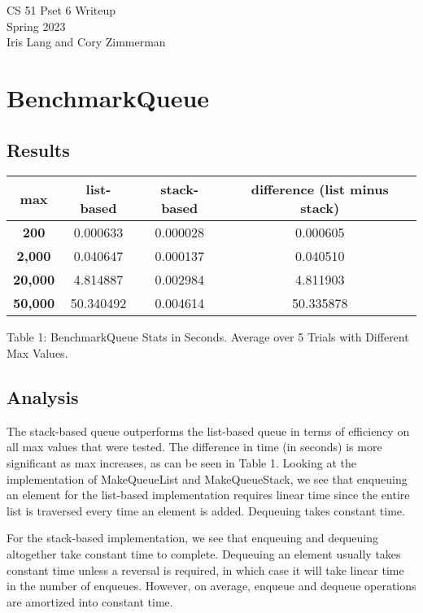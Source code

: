 \documentclass[12pt]{article}
\begin{document}
\begin{center}
{\Large CS 51 Pset 6 Writeup}\\
{\Large Spring 2023}\\
{\Large Iris Lang and Cory Zimmerman}\\
\end{center}


\section{BenchmarkQueue}

\subsection{Results}

\begin{center}
\begin{tabular}{ |c|c|c|c| } 
\hline
\textbf{max} & \textbf{list-based} & \textbf{stack-based} & \textbf{difference (list minus stack)} \\
\hline
\textbf{200} & 0.000633 & 0.000028 & 0.000605 \\ 
\textbf{2,000} & 0.040647 & 0.000137 & 0.040510 \\ 
\textbf{20,000} & 4.814887 & 0.002984 & 4.811903 \\
\textbf{50,000} & 50.340492 & 0.004614 & 50.335878 \\
\hline
\end{tabular}
\end{center}
Table 1: BenchmarkQueue Stats in Seconds. Average over 5 Trials with Different Max Values.


\subsection{Analysis}
\noindent

The stack-based queue outperforms the list-based queue in terms of efficiency on all max values that were tested. The difference in time (in seconds) is more significant as max increases, as can be seen in Table 1. Looking at the implementation of MakeQueueList and MakeQueueStack, we see that enqueuing an element for the list-based implementation requires linear time since the entire list is traversed every time an element is added. Dequeuing takes constant time.

For the stack-based implementation, we see that enqueuing and dequeuing altogether take constant time to complete. Dequeuing an element usually takes constant time unless a reversal is required, in which case it will take linear time in the number of enqueues. However, on average, enqueue and dequeue operations are amortized into constant time.
\end{document}
